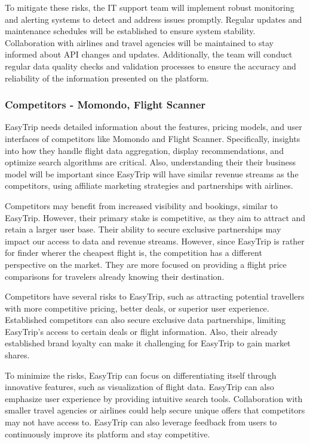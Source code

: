 To mitigate these risks, the IT support team will implement robust monitoring and alerting systems to detect and address issues promptly. Regular updates and maintenance schedules will be established to ensure system stability. Collaboration with airlines and travel agencies will be maintained to stay informed about API changes and updates. Additionally, the team will conduct regular data quality checks and validation processes to ensure the accuracy and reliability of the information presented on the platform.

\subsubsection{Competitors - Momondo, Flight Scanner}
EasyTrip needs detailed information about the features, pricing models, and user interfaces of competitors like Momondo and Flight Scanner. Specifically, insights into how they handle flight data aggregation, display recommendations, and optimize search algorithms are critical. Also, understanding their their business model will be important since EasyTrip will have similar revenue streams as the competitors, using affiliate marketing strategies and partnerships with airlines.


Competitors may benefit from increased visibility and bookings, similar to EasyTrip. However, their primary stake is competitive, as they aim to attract and retain a larger user base. Their ability to secure exclusive partnerships may impact our access to data and revenue streams. However, since EasyTrip is rather for finder wherer the cheapest flight is, the competition has a different perspective on the market. They are more focused on providing a flight price comparisons for travelers already knowing their destination.


Competitors have several risks to EasyTrip, such as attracting potential travellers with more competitive pricing, better deals, or superior user experience. Established competitors can also secure exclusive data partnerships, limiting EasyTrip’s access to certain deals or flight information. Also, their already established brand loyalty can make it challenging for EasyTrip to gain market shares.



To minimize the risks, EasyTrip can focus on differentiating itself through innovative features, such as visualization of flight data. EasyTrip can also emphasize user experience by providing intuitive search tools. Collaboration with smaller travel agencies or airlines could help secure unique offers that competitors may not have access to. EasyTrip can also leverage feedback from users to continuously improve its platform and stay competitive.


